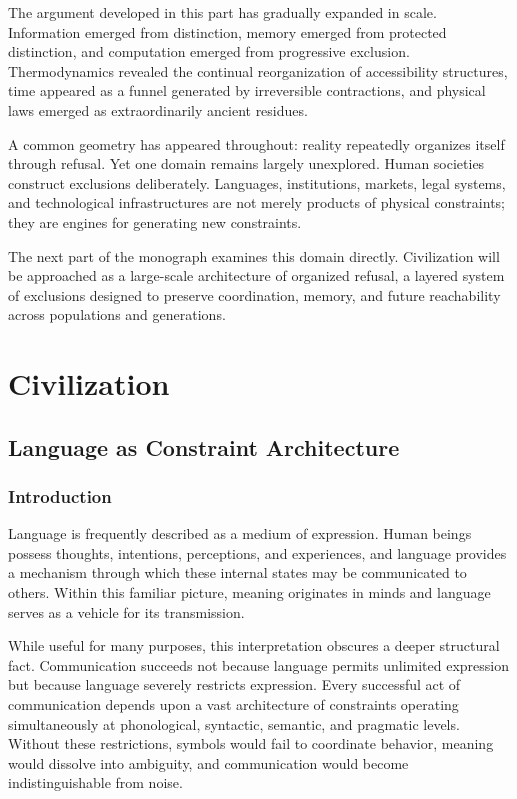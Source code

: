 \documentclass[11pt,oneside]{book}
\theoremstyle{plain}
\theoremstyle{definition}
\theoremstyle{remark}
\begin{document}
The argument developed in this part has gradually expanded in scale. Information emerged from distinction, memory emerged from protected distinction, and computation emerged from progressive exclusion. Thermodynamics revealed the continual reorganization of accessibility structures, time appeared as a funnel generated by irreversible contractions, and physical laws emerged as extraordinarily ancient residues.

A common geometry has appeared throughout: reality repeatedly organizes itself through refusal. Yet one domain remains largely unexplored. Human societies construct exclusions deliberately. Languages, institutions, markets, legal systems, and technological infrastructures are not merely products of physical constraints; they are engines for generating new constraints.

The next part of the monograph examines this domain directly. Civilization will be approached as a large-scale architecture of organized refusal, a layered system of exclusions designed to preserve coordination, memory, and future reachability across populations and generations.

\part{Civilization}

\chapter{Language as Constraint Architecture}

\section{Introduction}

Language is frequently described as a medium of expression. Human beings possess thoughts, intentions, perceptions, and experiences, and language provides a mechanism through which these internal states may be communicated to others. Within this familiar picture, meaning originates in minds and language serves as a vehicle for its transmission.

While useful for many purposes, this interpretation obscures a deeper structural fact. Communication succeeds not because language permits unlimited expression but because language severely restricts expression. Every successful act of communication depends upon a vast architecture of constraints operating simultaneously at phonological, syntactic, semantic, and pragmatic levels. Without these restrictions, symbols would fail to coordinate behavior, meaning would dissolve into ambiguity, and communication would become indistinguishable from noise.
\end{document}
